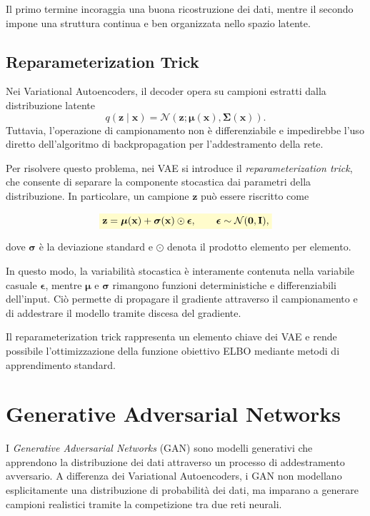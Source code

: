 \documentclass[a4paper,12pt]{report}
\newcommand{\highlight}[1]{%
\colorbox{yellow!20}{$\displaystyle #1$}%
}
\begin{document}
Il primo termine incoraggia una buona ricostruzione dei dati, mentre il secondo impone una struttura continua e ben organizzata 
nello spazio latente.

\subsection{Reparameterization Trick}

Nei Variational Autoencoders, il decoder opera su campioni estratti dalla distribuzione latente
\[
q(\mathbf{z} \mid \mathbf{x}) = \mathcal{N}(\mathbf{z}; \boldsymbol{\mu}(\mathbf{x}), \boldsymbol{\Sigma}(\mathbf{x})).
\]
Tuttavia, l’operazione di campionamento non è differenziabile e impedirebbe l’uso diretto dell’algoritmo di backpropagation per 
l’addestramento della rete.

Per risolvere questo problema, nei VAE si introduce il \emph{reparameterization trick}, che consente di separare la componente 
stocastica dai parametri della distribuzione. In particolare, un campione $\mathbf{z}$ può essere riscritto come

\[
\highlight{
\mathbf{z} = \boldsymbol{\mu}(\mathbf{x}) + \boldsymbol{\sigma}(\mathbf{x}) \odot \boldsymbol{\epsilon},
\qquad
\boldsymbol{\epsilon} \sim \mathcal{N}(\mathbf{0}, \mathbf{I}),}
\]

dove $\boldsymbol{\sigma}$ è la deviazione standard e $\odot$ denota il prodotto elemento per elemento.

In questo modo, la variabilità stocastica è interamente contenuta nella variabile casuale $\boldsymbol{\epsilon}$, 
mentre $\boldsymbol{\mu}$ e $\boldsymbol{\sigma}$ rimangono funzioni deterministiche e differenziabili dell’input. 
Ciò permette di propagare il gradiente attraverso il campionamento e di addestrare il modello tramite discesa del gradiente.

Il reparameterization trick rappresenta un elemento chiave dei VAE e rende possibile l’ottimizzazione della funzione obiettivo 
ELBO mediante metodi di apprendimento standard.

\section{Generative Adversarial Networks}

I \emph{Generative Adversarial Networks} (GAN) sono modelli generativi che apprendono la distribuzione dei dati attraverso un processo di addestramento avversario. A differenza dei Variational Autoencoders, i GAN non modellano esplicitamente una distribuzione di probabilità dei dati, ma imparano a generare campioni realistici tramite la competizione tra due reti neurali.
\end{document}
